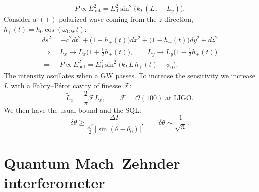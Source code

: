 \documentclass[11pt,a4paper]{article}
\begin{document}
\[
  P \propto E_{\text{out}}^2 = E_0^2\sin^2\bigl(k_L(L_x-L_y)\bigr).
\]
Consider a $(+)$-polarized wave coming from the $z$ direction, $h_+(t)=h_0\cos(\omega_{\text{GW}}t)$:
\begin{gather*}
  ds^2 = -c^2dt^2 + \bigl(1+h_+(t)\bigr)dx^2 + \bigl(1-h_+(t)\bigr)dy^2 + dz^2\\
  \Rightarrow\quad L_x \to L_x\bigl(1+\tfrac12 h_+(t)\bigr),\qquad L_y \to L_y\bigl(1-\tfrac12 h_+(t)\bigr)\\
  \Rightarrow\quad P \propto E_{\text{out}}^2 = E_0^2\sin^2\bigl(k_L L\,h_+(t)+\phi_0\bigr).
\end{gather*}
The intensity oscillates when a GW passes. To increase the sensitivity we increase $L$ with a Fabry--Pérot cavity of finesse $\mathcal F$:
\[
  \tilde L_x = \frac{2}{\pi}\mathcal F L_x, \qquad \mathcal F = \mathcal O(100) \text{ at LIGO}.
\]
We then have the usual bound and the SQL:
\[
  \delta\theta \geq \frac{\Delta I}{\frac{A^2}{2}\,|\sin(\theta-\theta_0)|}, \qquad \delta\theta \sim \frac{1}{\sqrt{\bar n}} .
\]

\section{Quantum Mach--Zehnder interferometer}

\begin{center}
\end{center}
\end{document}
